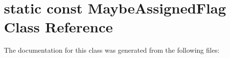 \hypertarget{classstatic_01const_01MaybeAssignedFlag}{}\section{static const Maybe\+Assigned\+Flag Class Reference}
\label{classstatic_01const_01MaybeAssignedFlag}


The documentation for this class was generated from the following files\+: